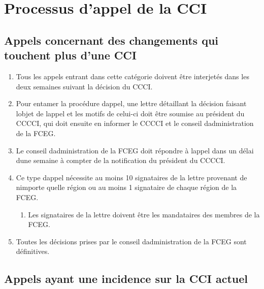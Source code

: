 \section{Processus d'appel de la CCI}
\label{processus-dappel-de-la-cci}

\subsection{Appels concernant des changements qui touchent plus d'une CCI}
\label{appels-concernant-des-changements-qui-touchent-plus-dune-cci}

\begin{enumerate}
 \item
  Tous les appels entrant dans cette catégorie doivent être interjetés dans les deux semaines suivant la décision du CCCI.
 \item
  Pour entamer la procédure d\textquotesingle appel, une lettre détaillant la décision faisant l\textquotesingle objet de l\textquotesingle appel et les motifs de celui-ci doit être soumise au président du CCCCI, qui doit ensuite en informer le CCCCI et le conseil d\textquotesingle administration de la FCEG.
 \item
  Le conseil d\textquotesingle administration de la FCEG doit répondre à l\textquotesingle appel dans un délai d\textquotesingle une semaine à compter de la notification du président du CCCCI.
 \item
  Ce type d\textquotesingle appel nécessite au moins 10 signataires de la lettre provenant de n\textquotesingle importe quelle région ou au moins 1 signataire de chaque région de la FCEG.

  \begin{enumerate}
   \item
    Les signataires de la lettre doivent être les mandataires des membres de la FCEG.
  \end{enumerate}

 \item
  Toutes les décisions prises par le conseil d\textquotesingle administration de la FCEG sont définitives.
\end{enumerate}

\subsection{Appels ayant une incidence sur la CCI actuel}
\label{appels-ayant-une-incidence-sur-la-cci-actuel}

